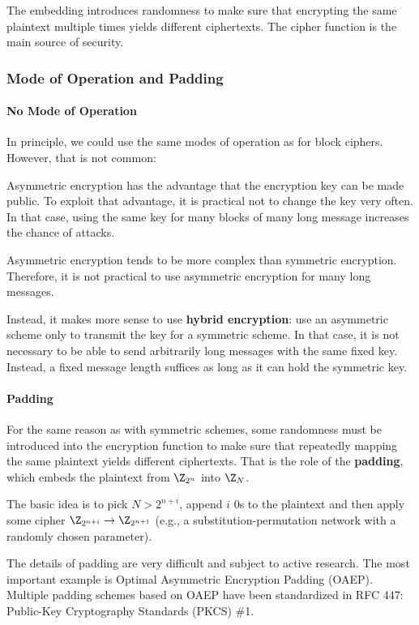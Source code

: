 The embedding introduces randomness to make sure that encrypting the same plaintext multiple times yields different ciphertexts.
The cipher function is the main source of security.

\subsubsection{Mode of Operation and Padding}

\paragraph{No Mode of Operation}
In principle, we could use the same modes of operation as for block ciphers.
However, that is not common:
\begin{compactitem}
 \item Asymmetric encryption has the advantage that the encryption key can be made public.
 To exploit that advantage, it is practical not to change the key very often.
 In that case, using the same key for many blocks of many long message increases the chance of attacks.
 \item Asymmetric encryption tends to be more complex than symmetric encryption.
 Therefore, it is not practical to use asymmetric encryption for many long messages.
\end{compactitem}
Instead, it makes more sense to use \textbf{hybrid encryption}: use an asymmetric scheme only to transmit the key for a symmetric scheme.
In that case, it is not necessary to be able to send arbitrarily long messages with the same fixed key.
Instead, a fixed message length suffices as long as it can hold the symmetric key.

\paragraph{Padding}
For the same reason as with symmetric schemes, some randomness must be introduced into the encryption function to make sure that repeatedly mapping the same plaintext yields different ciphertexts.
That is the role of the \textbf{padding}, which embeds the plaintext from $\Z_{2^n}$ into $\Z_N$.

The basic idea is to pick $N>2^{n+i}$, append $i$ $0$s to the plaintext and then apply some cipher $\Z_{2^{n+i}}\to\Z_{2^{n+1}}$ (e.g., a substitution-permutation network with a randomly chosen parameter).

The details of padding are very difficult and subject to active research.
The most important example is Optimal Asymmetric Encryption Padding (OAEP).
Multiple padding schemes based on OAEP have been standardized in RFC 447: Public-Key Cryptography Standards (PKCS) \#1.

